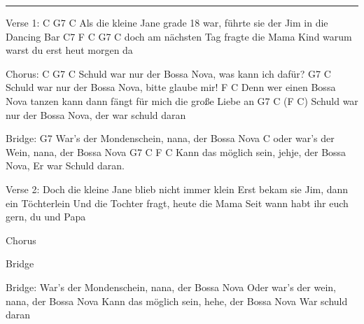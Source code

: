 \noindent\rule{\columnwidth}{1pt}

\begin{lstsong}
Verse 1:
C                             G7                                     C
Als die kleine Jane grade 18 war, führte sie der Jim in die Dancing Bar
                 C7               F        C             G7               C
doch am nächsten Tag fragte die Mama Kind warum warst du erst heut morgen da

Chorus:
   C                     G7                   C
Schuld war nur der Bossa Nova, was kann ich dafür?
                         G7                 C
Schuld war nur der Bossa Nova, bitte glaube mir!
                     F                                        C
Denn wer einen Bossa Nova tanzen kann dann fängt für mich die große Liebe an
                         G7                     C    (F C)
Schuld war nur der Bossa Nova, der war schuld daran

Bridge:
                G7
War's der Mondenschein, nana, der Bossa Nova
               C
oder war's der Wein, nana, der Bossa Nova
                 G7                           C      F        C
Kann das möglich sein, jehje, der Bossa Nova, Er war Schuld daran.

Verse 2:
Doch die kleine Jane blieb nicht immer klein
Erst bekam sie Jim, dann ein Töchterlein
Und die Tochter fragt, heute die Mama
Seit wann habt ihr euch gern, du und Papa

Chorus

Bridge

Bridge:
War's der Mondenschein, nana, der Bossa Nova
Oder war's der wein, nana, der Bossa Nova
Kann das möglich sein, hehe, der Bossa Nova
War schuld daran
\end{lstsong}
\newpage
